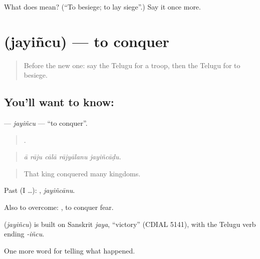 \begin{tcolorbox}[breakable,colback=teal!4,colframe=teal!35!black,title={Before you move on}]
What does  mean? (\textquotedblleft{}To besiege; to lay siege\textquotedblright{}.) Say it once more.
\end{tcolorbox}
\section[\texorpdfstring{\te{జయించు} (jayiñcu)}{జయించు (jayiñcu)}]{ (jayiñcu) — to conquer}

\label{lesson:TE-C361-jayincu}



\begin{quote}
Before the new one: say the Telugu for a troop, then the Telugu for to besiege.
\end{quote}

\subsection*{You'll want to know: }
\textbf{} — \emph{jayiñcu} — \textquotedblleft{}to conquer\textquotedblright{}.

\begin{quote}
    .
\end{quote}

\begin{quote}
\emph{ā rāju cālā rājyālanu jayiñcāḍu.}
\end{quote}

\begin{quote}
That king conquered many kingdoms.
\end{quote}

Past (I …): , \emph{jayiñcānu}.

Also to overcome:  , to conquer fear.

\begin{cousinweb}
\textbf{} (\emph{jayiñcu}) is built on Sanskrit \emph{jaya}, \textquotedblleft{}victory\textquotedblright{} (CDIAL 5141), with the Telugu verb ending \emph{-iñcu}.
\end{cousinweb}

\begin{grammarlens}[title={What you've built}]
One more word for telling what happened.
\end{grammarlens}

